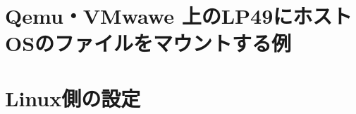 \section{Qemu・VMwawe 上のLP49にホストOSのファイルをマウントする例}
\begin{comment}    

       *---------  Linux -------------------*          
       | -*--- LP49 ------*     Linux-file-tree     |  
       |  |               |                         |  
       |  |     /dev/      |                        |  
       |  |    /n ------ - |--------  /aa/          |  
       |  |                |                bb/     |  
       |  |                |                     b1 |  
       |  |    LP49        |                     b2 |  
       |  |                |                cc/     |  
       |  |                |                     c1 |  
       |  |                |                dd/     |  
       | -*------------*                            |  
       *--------------------------------*              

\begin{figure}
\begin{center}
\setlength{\unitlength}{1mm}
\begin{picture}(140, 70)
  \put(10,0){\framebox(50, 60)[tc]{LP49: Import side}}
  \put(10,40){\makebox(50, 10)[tc]{Name Space}}
  \put(80,0){\framebox(50, 60)[tc]{Linux Host OS}}
  \put(80,40){\makebox(50, 10)[tc]{Name Space}}
\end{picture}
\end{center}
\caption{LinuxのファイルシステムをLP49にマウント}
\end{figure}

\end{comment}    

    
\section{Linux側の設定}

